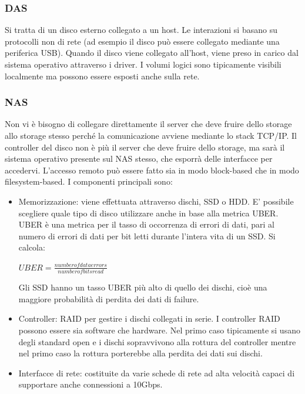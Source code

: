 \documentclass{article}
\begin{document}
		\subsubsection{DAS}
		Si tratta di un disco esterno collegato a un host. Le interazioni si basano su protocolli non di rete (ad esempio il disco può essere collegato mediante una periferica USB).
		Quando il disco viene collegato all'host, viene preso in carico dal sistema operativo attraverso i driver. I volumi logici sono tipicamente visibili localmente ma possono essere esposti anche sulla rete. 
		\subsubsection{NAS}
		Non vi è bisogno di collegare direttamente il server che deve fruire dello storage allo storage stesso perché la comunicazione avviene mediante lo stack TCP/IP. Il controller del disco non è più il server che deve fruire dello storage, ma sarà il sistema operativo presente sul NAS stesso, che esporrà delle interfacce per accedervi. L’accesso remoto può essere fatto sia in modo block-based che in modo filesystem-based.
		I componenti principali sono:
		\begin{itemize}
		    \item Memorizzazione: viene effettuata attraverso dischi, SSD o HDD.
		    E' possibile scegliere quale tipo di disco utilizzare anche in base alla metrica UBER.\\
		    UBER è una metrica per il tasso di occorrenza di errori di dati, pari al numero di errori di dati per bit letti durante l'intera vita di un SSD. Si calcola:
		    \begin{center}
		     $ UBER= \frac{number of data errors}{number of bits read}$
		    \end{center}
		    Gli SSD hanno un tasso UBER più alto di quello dei dischi, cioè una maggiore probabilità di perdita dei dati di failure.
		    \item Controller: RAID per gestire i dischi collegati in serie. I controller RAID possono essere sia software che hardware. Nel primo caso tipicamente si usano degli standard open e i dischi sopravvivono alla rottura del controller mentre nel primo caso la rottura porterebbe alla perdita dei dati sui dischi.
		    \item Interfacce di rete: costituite da varie schede di rete ad alta velocità capaci di supportare anche connessioni a 10Gbps.
		\end{itemize}
\end{document}
